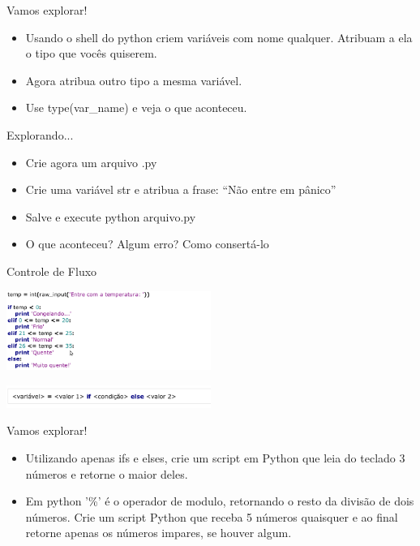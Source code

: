 \documentclass{beamer}
\begin{document}
\begin{frame}{Vamos explorar!}
 \begin{itemize}
  \item Usando o shell do python criem vari\'aveis com nome qualquer. Atribuam a ela o tipo que voc\^es quiserem. 
  \item Agora atribua outro tipo a mesma vari\'avel. 
   \item Use type(var\_name) e veja o que aconteceu.
 \end{itemize}

\end{frame}

\begin{frame}{Explorando...}
 \begin{itemize}
  \item Crie agora um arquivo .py
  \item Crie uma vari\'avel str e atribua a frase: ``N\~ao entre em p\^anico''
  \item Salve e execute python arquivo.py
  \item O que aconteceu? Algum erro? Como consert\'a\--lo

 \end{itemize}

\end{frame}

\begin{frame}{Controle de Fluxo}
  \begin{center}
   \includegraphics[width=0.5\textwidth]{images/controle_fluxo.png}
\end{center}
 \begin{center}
   \includegraphics[width=0.5\textwidth]{images/ternario.png}
\end{center}
\end{frame}

\begin{frame}{Vamos explorar!}
 \begin{itemize}
  \item Utilizando apenas ifs e elses, crie um script em Python que leia do teclado 3 n\'umeros e retorne o maior deles.
  \item Em python '\%' \'e o operador de modulo, retornando o resto da divis\~ao de dois n\'umeros. Crie um script Python que receba 5 n\'umeros quaisquer e ao final retorne apenas os n\'umeros impares, se houver algum.
 \end{itemize}

\end{frame}
\end{document}
